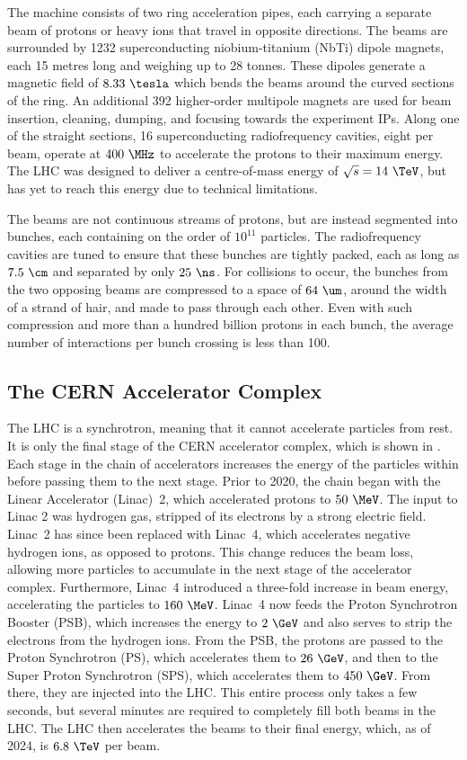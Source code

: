 The machine consists of two ring acceleration pipes, each carrying a separate beam of protons or heavy ions that travel in opposite directions.
The beams are surrounded by 1232 superconducting niobium-titanium (NbTi) dipole magnets, each 15 metres long and weighing up to 28 tonnes.
These dipoles generate a magnetic field of $8.33~\tesla$ which bends the beams around the curved sections of the ring.
An additional 392 higher-order multipole magnets are used for beam insertion, cleaning, dumping, and focusing towards the experiment IPs.
Along one of the straight sections, 16 superconducting radiofrequency cavities, eight per beam, operate at $400~\MHz$ to accelerate the protons to their maximum energy.
The LHC was designed to deliver a centre-of-mass energy of $\sqrt{s}=14~\TeV$, but has yet to reach this energy due to technical limitations.

The beams are not continuous streams of protons, but are instead segmented into bunches, each containing on the order of $10^{11}$ particles.
The radiofrequency cavities are tuned to ensure that these bunches are tightly packed, each as long as $7.5~\cm$ and separated by only $25~\ns$.
For collisions to occur, the bunches from the two opposing beams are compressed to a space of $64~\um$, around the width of a strand of hair, and made to pass through each other.
Even with such compression and more than a hundred billion protons in each bunch, the average number of interactions per bunch crossing \avemu is less than 100.

\subsection{The CERN Accelerator Complex}

The LHC is a synchrotron, meaning that it cannot accelerate particles from rest.
It is only the final stage of the CERN accelerator complex, which is shown in .
Each stage in the chain of accelerators increases the energy of the particles within before passing them to the next stage.
Prior to 2020, the chain began with the Linear Accelerator (Linac)~2, which accelerated protons to $50~\MeV$.
The input to Linac 2 was hydrogen gas, stripped of its electrons by a strong electric field.
Linac~2 has since been replaced with Linac~4, which accelerates negative hydrogen ions, as opposed to protons.
This change reduces the beam loss, allowing more particles to accumulate in the next stage of the accelerator complex.
Furthermore, Linac~4 introduced a three-fold increase in beam energy, accelerating the particles to $160~\MeV$.
Linac~4 now feeds the Proton Synchrotron Booster (PSB), which increases the energy to $2~\GeV$ and also serves to strip the electrons from the hydrogen ions.
From the PSB, the protons are passed to the Proton Synchrotron (PS), which accelerates them to $26~\GeV$, and then to the Super Proton Synchrotron (SPS), which accelerates them to $450~\GeV$.
From there, they are injected into the LHC.
This entire process only takes a few seconds, but several minutes are required to completely fill both beams in the LHC.
The LHC then accelerates the beams to their final energy, which, as of 2024, is $6.8~\TeV$ per beam.

